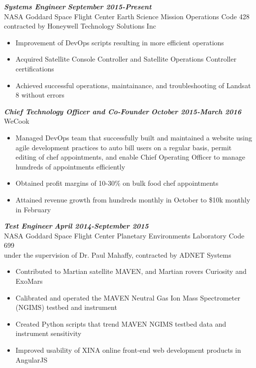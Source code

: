 \documentclass{res}
\begin{document}
\begin{resume}
	{\bfseries {\em Systems Engineer}}  \hfill  {\bfseries{\em September 2015-Present}}\\
		NASA Goddard Space Flight Center Earth Science Mission Operations Code 428\\
		contracted by Honeywell Technology Solutions Inc
                \begin{itemize}  \itemsep -2pt %
		\item Improvement of DevOps scripts resulting in more efficient operations
		\item Acquired Satellite Console Controller and Satellite Operations Controller certifications
		\item Achieved successful operations, maintainance, and troubleshooting of Landsat 8 without errors
                \end{itemize}
	{\bfseries {\em Chief Technology Officer and Co-Founder}}  \hfill  {\bfseries{\em October 2015-March 2016}}\\
		WeCook
                \begin{itemize}  \itemsep -2pt %
		\item Managed DevOps team that successfully built and maintained a website using agile development practices to auto bill users on a regular basis, permit editing of chef appointments, and enable Chief Operating Officer to manage hundreds of appointments efficiently
                \item Obtained profit margins of 10-30\% on bulk food chef appointments
		\item Attained revenue growth from hundreds monthly in October to \$10k monthly in February
                \end{itemize}
	{\bfseries {\em Test Engineer}}  \hfill  {\bfseries{\em April 2014-September 2015}}\\
		NASA Goddard Space Flight Center Planetary Environments Laboratory Code 699\\
                under the supervision of Dr. Paul Mahaffy, contracted by ADNET Systems
                \begin{itemize}  \itemsep -2pt %
                \item  Contributed to Martian satellite MAVEN, and Martian rovers Curiosity and ExoMars
		\item Calibrated and operated the MAVEN Neutral Gas Ion Mass Spectrometer (NGIMS) testbed and instrument
		\item Created Python scripts that trend MAVEN NGIMS testbed data and instrument sensitivity
		\item Improved usability of XINA online front-end web development products in AngularJS
                \end{itemize}


\end{resume}
\end{document}
